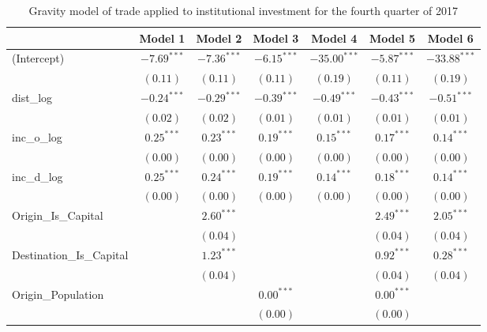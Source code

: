 \begin{table}
	\begin{center}
		\small
		\caption[CGravity Model of Trade for Q4 2017]{Gravity model of trade applied to institutional investment for the fourth quarter of 2017}
		\begin{tabular}{l c c c c c c }
			\hline
			& Model 1 & Model 2 & Model 3 & Model 4 & Model 5 & Model 6 \\
			\hline
			(Intercept)                  & $-7.69^{***}$ & $-7.36^{***}$ & $-6.15^{***}$ & $-35.00^{***}$ & $-5.87^{***}$ & $-33.88^{***}$ \\
			& $(0.11)$      & $(0.11)$      & $(0.11)$      & $(0.19)$       & $(0.11)$      & $(0.19)$       \\
			dist\_log                    & $-0.24^{***}$ & $-0.29^{***}$ & $-0.39^{***}$ & $-0.49^{***}$  & $-0.43^{***}$ & $-0.51^{***}$  \\
			& $(0.02)$      & $(0.02)$      & $(0.01)$      & $(0.01)$       & $(0.01)$      & $(0.01)$       \\
			inc\_o\_log                  & $0.25^{***}$  & $0.23^{***}$  & $0.19^{***}$  & $0.15^{***}$   & $0.17^{***}$  & $0.14^{***}$   \\
			& $(0.00)$      & $(0.00)$      & $(0.00)$      & $(0.00)$       & $(0.00)$      & $(0.00)$       \\
			inc\_d\_log                  & $0.25^{***}$  & $0.24^{***}$  & $0.19^{***}$  & $0.14^{***}$   & $0.18^{***}$  & $0.14^{***}$   \\
			& $(0.00)$      & $(0.00)$      & $(0.00)$      & $(0.00)$       & $(0.00)$      & $(0.00)$       \\
			Origin\_Is\_Capital          &               & $2.60^{***}$  &               &                & $2.49^{***}$  & $2.05^{***}$   \\
			&               & $(0.04)$      &               &                & $(0.04)$      & $(0.04)$       \\
			Destination\_Is\_Capital     &               & $1.23^{***}$  &               &                & $0.92^{***}$  & $0.28^{***}$   \\
			&               & $(0.04)$      &               &                & $(0.04)$      & $(0.04)$       \\
			Origin\_Population           &               &               & $0.00^{***}$  &                & $0.00^{***}$  &                \\
			&               &               & $(0.00)$      &                & $(0.00)$      &                \\

\end{tabular}
\end{center}
\end{table}
